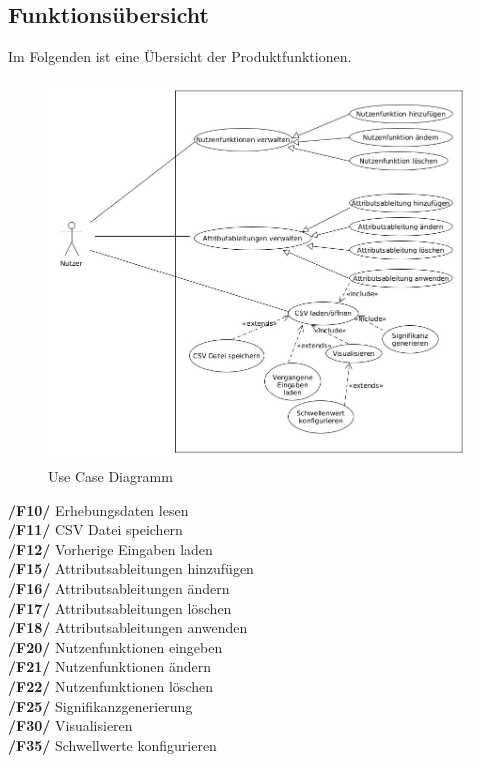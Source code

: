 \documentclass{article}
\begin{document}
\subsection{Funktionsübersicht}
Im Folgenden ist eine Übersicht der Produktfunktionen.
\begin{figure}[H]%
  \centering
  \includegraphics[width=15cm]{use case4.jpg}
  \caption{Use Case Diagramm}
\end{figure} 
\newpage
\textbf{/F10/} Erhebungsdaten lesen \\
\textbf{/F11/} CSV Datei speichern \\
\textbf{/F12/} Vorherige Eingaben laden \\
\textbf{/F15/} Attributsableitungen hinzufügen \\
\textbf{/F16/} Attributsableitungen ändern \\
\textbf{/F17/} Attributsableitungen löschen \\
\textbf{/F18/} Attributsableitungen anwenden \\
\textbf{/F20/} Nutzenfunktionen eingeben \\
\textbf{/F21/} Nutzenfunktionen ändern \\
\textbf {/F22/} Nutzenfunktionen löschen \\
\textbf{/F25/} Signifikanzgenerierung \\
\textbf{/F30/} Visualisieren \\
\textbf{/F35/} Schwellwerte konfigurieren
\\[0.5in]
\end{document}
